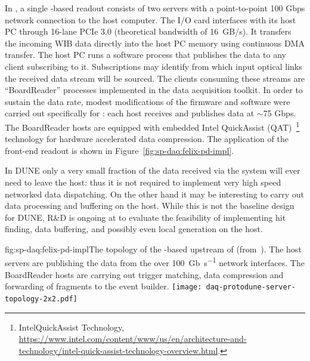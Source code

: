In , a single  -based readout consists of two servers with a point-to-point 100 Gbps network connection to the  host computer.
The  I/O card interfaces with its host PC through 16-lane PCIe 3.0 (theoretical bandwidth of \SI{16}{GB/s}).
It transfers the incoming WIB data directly into the host PC memory using continuous DMA transfer. The  host PC runs a software process that publishes the data to any client subscribing to it.
Subscriptions may identify from which input optical links the received data stream will be sourced.
The clients consuming these streams are ``BoardReader'' processes implemented in the  data acquisition toolkit.
In order to sustain the data rate, modest modifications of the firmware and software were carried out specifically for : each  host receives and publishes data at $\sim$75 Gbps. The BoardReader hosts are equipped with embedded Intel QuickAssist (QAT)~\footnote{Intel\textregistered QuickAssist Technology, \url{https://www.intel.com/content/www/us/en/architecture-and-technology/intel-quick-assist-technology-overview.html}.} technology for hardware accelerated data compression. The  application of the  front-end readout is shown in Figure~\ref{fig:sp-daq:felix-pd-impl}.


In DUNE only a very small fraction of the data received via the 
system will ever need to leave the host: thus it is not required to
implement very high speed networked data dispatching. On the other
hand it may be interesting to carry out data processing and buffering
on the host. While this is not the baseline design for DUNE, R\&D is
ongoing at  to evaluate the feasibility of
implementing hit finding, data buffering, and possibly even local
 generation on the  host. 


\begin{dunefigure}{fig:sp-daq:felix-pd-impl}{The topology of the -based
    upstream  of  (from~\cite{pdsp-felix}). The  host servers are publishing the data from the  over \SI{100}{Gb\per\second} network interfaces. The BoardReader hosts are carrying out trigger matching, data compression and forwarding of fragments to the event builder.}
  \texttt{[image: daq-protodune-server-topology-2x2.pdf]}
\end{dunefigure}

